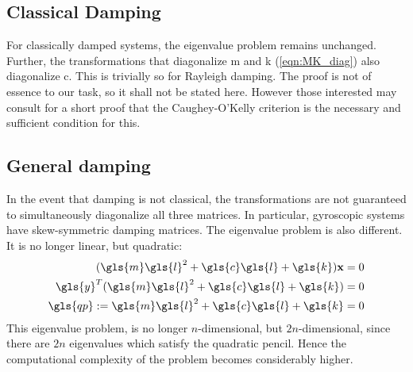 \subsection{Classical Damping}
For classically damped systems, the eigenvalue problem remains unchanged. Further,
the transformations that diagonalize \gls{m} and \gls{k} (\autoref{eqn:MK_diag}) 
also diagonalize \gls{c}. This is trivially so for Rayleigh
damping. The proof is not of essence to our task, so it shall not be stated here.
However those interested may consult \citet{Inman15012001} for a short proof
that the Caughey-O'Kelly criterion is the necessary and sufficient condition
for this.

\subsection{General damping}
In the event that damping is not classical, the transformations are not 
guaranteed to simultaneously diagonalize all three matrices.  In 
particular, gyroscopic systems have skew-symmetric damping matrices. The 
eigenvalue problem is also different. It is no longer linear, but quadratic:
\begin{subequations}
\label{eqn:quadratic_problem}
\begin{align}
	(\gls{m}\gls{l}^{2} + \gls{c}\gls{l} + \gls{k})\mathbf{x} &= 0 \label{eqn:quadratic_pencil_r} \\
	\gls{y}^T(\gls{m}\gls{l}^{2} + \gls{c}\gls{l} + \gls{k}) &= 0 \label{eqn:quadratic_pencil_l}\\
	\gls{qp} := \gls{m}\gls{l}^{2} + \gls{c}\gls{l} + \gls{k} &= 0 \label{eqn:quadratic_pencil}
\end{align}
\end{subequations}	
This eigenvalue problem, is no longer $n$-dimensional, but $2n$-dimensional,
since there are $2n$ eigenvalues which satisfy the quadratic pencil. Hence the
computational complexity of the problem becomes considerably higher.

